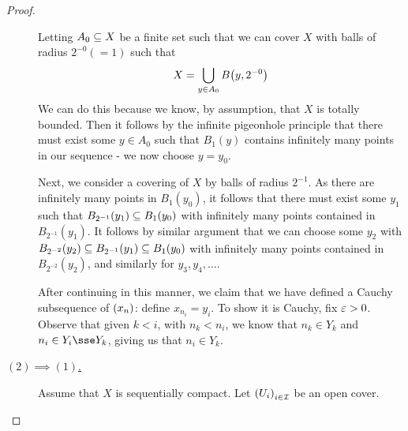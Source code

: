 \begin{proof}
\begin{description}
        Letting $A_0 \subseteq X$ be a finite set such that we can cover $X$ with balls of radius $2^{-0}(=1)$ such that
        \begin{align*}
            X = \bigcup_{y \in A_0} B\of{y, 2^{-0}} %
        \end{align*}
        We can do this because we know, by assumption, that $X$ is totally bounded. Then it follows by the infinite pigeonhole principle that there must exist some $y\in A_0$ such that $B_1(y)$ contains infinitely many points in our sequence - we now choose $y=y_0$.

        Next, we consider a covering of $X$ by balls of radius $2^{-1}$. As there are infinitely many points in $B_1(y_0)$, it follows that there must exist some $y_1$ such that $B_{2^{-1}}(y_1)\subseteq B_1(y_0)$ with infinitely many points contained in $B_{2^{-1}}(y_1)$. It follows by similar argument that we can choose some $y_2$ with $B_{2^{-2}}(y_2)\subseteq B_{2^{-1}}(y_1)\subseteq B_1(y_0)$ with infinitely many points contained in $B_{2^{-2}}(y_2)$, and similarly for $y_3, y_4, \ldots$.

        After continuing in this manner, we claim that we have defined a Cauchy subsequence of $\left( x_n \right)$: define $x_{n_i} = y_i$. To show it is Cauchy, fix $\varepsilon > 0$. Observe that given $k < i$, with $n_k < n_i$, we know that $n_k \in Y_k$ and $n_i \in Y_i \sse Y_k$, giving us that $n_i \in Y_k$. \sorry

        \item[\underline{$(2) \implies (1)$.}] Assume that $X$ is sequentially compact. Let $\left( U_i \right)_{i \in \mathcal{I}}$ be an open cover.
    \end{description}
\end{proof}%



